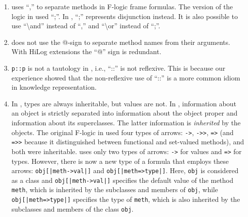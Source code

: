 \documentclass[11pt]{article}
\newcommand{\ERGO}{\mbox{\smaller{\ensuremath{\cal{E}}\smaller{{\sc{RGO}}}}}\xspace}
\newcommand{\FLSYSTEM}{\ERGO}
\newcommand{\bs}{\textbackslash}
\begin{document}
\begin{enumerate}
\item \FLSYSTEM uses ``,'' to separate methods in F-logic frame formulas. The version of
  the logic in \cite{KLW95} used ``;''. In \FLSYSTEM, ``;'' represents
  disjunction instead. It is also possible to use ``\bs{}and'' instead of ``,''
  and ``\bs{}or'' instead of ``;''.
\item \FLSYSTEM does not use the @-sign to separate method names from their
  arguments. With HiLog extensions the ``@'' sign is redundant.
\item  {\tt p::p} is not a tautology in \FLSYSTEM, i.e., ``::'' is not
  reflexive. This is because our experience showed that the non-reflexive
  use of ``::'' is a more common idiom in knowledge representation.
\item In \cite{KLW95}, types are always inheritable, but values are not.
  In \FLSYSTEM, information about an object
  is strictly separated into information about the object proper
  and information about its superclasses. The latter information is
  \emph{inherited} by the objects. 
  The original F-logic in
  \cite{KLW95} used four types of arrows:
  \texttt{->}, \texttt{->{}>},   {\tt =>} (and {\tt =>{}>}
  because it distinguished
  between functional and set-valued methods), and both were inheritable.
  \FLSYSTEM uses only two types of arrows: \texttt{->} for values and
  \texttt{=>} for types. However, there is now a new type of a formula that
  employs these arrows: \texttt{obj[|meth->val|]}  and
  \texttt{obj[|meth=>type|]}. Here, \texttt{obj} is considered as a class
  and \texttt{obj[|meth->val|]} specifies the default value of the method
  \texttt{meth}, which is inherited by the subclasses and
  members of \texttt{obj}, while \texttt{obj[|meth=>type|]} specifies
  the type of \texttt{meth}, which is also inherited by the subclasses and
  members of the class \texttt{obj}.  


\end{enumerate}
\end{document}
